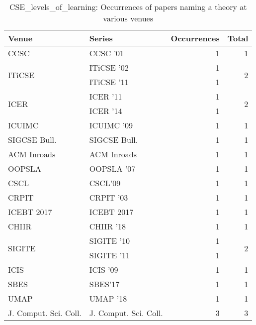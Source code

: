 \begin{table*}[t]
\begin{tabular}{llrr}
Venue & Series & Occurrences & Total\\\hline
\multirow{1}{*}{CCSC } & CCSC '01 & 1 & \multirow{1}{*}{1}\\
\multirow{2}{*}{ITiCSE } & ITiCSE '02 & 1 & \multirow{2}{*}{2}\\
& ITiCSE '11 & 1 &\\
\multirow{2}{*}{ICER } & ICER '11 & 1 & \multirow{2}{*}{2}\\
& ICER '14 & 1 &\\
\multirow{1}{*}{ICUIMC } & ICUIMC '09 & 1 & \multirow{1}{*}{1}\\
\multirow{1}{*}{SIGCSE Bull.} & SIGCSE Bull. & 1 & \multirow{1}{*}{1}\\
\multirow{1}{*}{ACM Inroads} & ACM Inroads & 1 & \multirow{1}{*}{1}\\
\multirow{1}{*}{OOPSLA } & OOPSLA '07 & 1 & \multirow{1}{*}{1}\\
\multirow{1}{*}{CSCL} & CSCL'09 & 1 & \multirow{1}{*}{1}\\
\multirow{1}{*}{CRPIT } & CRPIT '03 & 1 & \multirow{1}{*}{1}\\
\multirow{1}{*}{ICEBT 2017} & ICEBT 2017 & 1 & \multirow{1}{*}{1}\\
\multirow{1}{*}{CHIIR } & CHIIR '18 & 1 & \multirow{1}{*}{1}\\
\multirow{2}{*}{SIGITE } & SIGITE '10 & 1 & \multirow{2}{*}{2}\\
& SIGITE '11 & 1 &\\
\multirow{1}{*}{ICIS } & ICIS '09 & 1 & \multirow{1}{*}{1}\\
\multirow{1}{*}{SBES} & SBES'17 & 1 & \multirow{1}{*}{1}\\
\multirow{1}{*}{UMAP } & UMAP '18 & 1 & \multirow{1}{*}{1}\\
\multirow{1}{*}{J. Comput. Sci. Coll.} & J. Comput. Sci. Coll. & 3 & \multirow{1}{*}{3}\\
\end{tabular}
\caption{CSE\_levels\_of\_learning: Occurrences of papers naming a theory at various venues}
\end{table*}